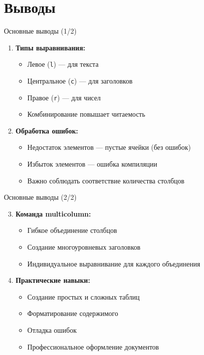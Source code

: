 \documentclass[aspectratio=169]{beamer}
\begin{document}
\section{Выводы}

\begin{frame}{Основные выводы (1/2)}
    \begin{enumerate}
        \item \textbf{Типы выравнивания:}
        \begin{itemize}
            \item Левое (\texttt{l}) — для текста
            \item Центральное (\texttt{c}) — для заголовков
            \item Правое (\texttt{r}) — для чисел
            \item Комбинирование повышает читаемость
        \end{itemize}
        
        \vspace{0.3cm}
        
        \item \textbf{Обработка ошибок:}
        \begin{itemize}
            \item Недостаток элементов — пустые ячейки (без ошибок)
            \item Избыток элементов — ошибка компиляции
            \item Важно соблюдать соответствие количества столбцов
        \end{itemize}
    \end{enumerate}
\end{frame}

\begin{frame}{Основные выводы (2/2)}
    \begin{enumerate}
        \setcounter{enumi}{2}
        \item \textbf{Команда multicolumn:}
        \begin{itemize}
            \item Гибкое объединение столбцов
            \item Создание многоуровневых заголовков
            \item Индивидуальное выравнивание для каждого объединения
        \end{itemize}
        
        \vspace{0.3cm}
        
        \item \textbf{Практические навыки:}
        \begin{itemize}
            \item Создание простых и сложных таблиц
            \item Форматирование содержимого
            \item Отладка ошибок
            \item Профессиональное оформление документов
        \end{itemize}
    \end{enumerate}
\end{frame}
\end{document}
